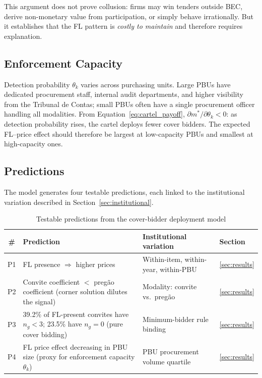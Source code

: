 This argument does not prove collusion: firms may win tenders
outside BEC, derive non-monetary value from participation, or simply
behave irrationally. But it establishes that the FL pattern is
\emph{costly to maintain} and therefore requires explanation.

\subsection{Enforcement Capacity}
\label{sec:enforcement}

Detection probability $\theta_k$ varies across purchasing units.
Large PBUs have dedicated procurement staff, internal audit
departments, and higher visibility from the Tribunal de Contas;
small PBUs often have a single procurement officer handling all
modalities. From Equation~\eqref{eq:cartel_payoff}, $\partial
m^*/\partial \theta_k < 0$: as detection probability rises, the
cartel deploys fewer cover bidders. The expected FL--price effect
should therefore be largest at low-capacity PBUs and smallest at
high-capacity ones.

\subsection{Predictions}
\label{sec:predictions}

The model generates four testable predictions, each linked to the
institutional variation described in Section~\ref{sec:institutional}.

\begin{table}[htbp]
\centering
\caption{Testable predictions from the cover-bidder deployment model}
\label{tab:predictions}
\small
\begin{tabular}{clll}
\toprule
\# & Prediction & Institutional variation & Section \\
\midrule
P1 & FL presence $\Rightarrow$ higher prices
   & Within-item, within-year, within-PBU
   & \ref{sec:results} \\[4pt]
P2 & \parbox[t]{6.2cm}{Convite coefficient $<$ preg\~ao coefficient\\
   (corner solution dilutes the signal)}
   & Modality: convite vs.\ preg\~ao
   & \ref{sec:results} \\[4pt]
P3 & \parbox[t]{6.2cm}{39.2\% of FL-present convites have $n_g < 3$;\\
   23.5\% have $n_g = 0$ (pure cover bidding)}
   & Minimum-bidder rule binding
   & \ref{sec:results} \\[4pt]
P4 & \parbox[t]{6.2cm}{FL price effect decreasing in PBU size\\
   (proxy for enforcement capacity $\theta_k$)}
   & PBU procurement volume quartile
   & \ref{sec:results} \\
\bottomrule
\end{tabular}
\end{table}

